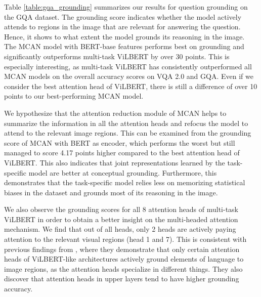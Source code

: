 \documentclass{article}
\begin{document}
Table \ref{table:gqa_grounding} summarizes our results for question grounding on the GQA dataset. The grounding score indicates whether the model actively attends to regions in the image that are relevant for answering the question. Hence, it shows to what extent the model grounds its reasoning in the image. The MCAN model with BERT-base features performs best on grounding and significantly outperforms multi-task ViLBERT by over 30 points. This is especially interesting, as multi-task ViLBERT has consistently outperformed all MCAN models on the overall accuracy scores on VQA 2.0 and GQA. Even if we consider the best attention head of ViLBERT, there is still a difference of over 10 points to our best-performing MCAN model.

We hypothesize that the attention reduction module of MCAN helps to summarize the information in all the attention heads and refocus the model to attend to the relevant image regions. This can be examined from the grounding score of MCAN with BERT as encoder, which performs the worst but still managed to score 4.17 points higher compared to the best attention head of ViLBERT. This also indicates that joint representations learned by the task-specific model are better at conceptual grounding. Furthermore, this demonstrates that the task-specific model relies less on memorizing statistical biases in the dataset and grounds most of its reasoning in the image.


We also observe the grounding scores for all 8 attention heads of multi-task ViLBERT in order to obtain a better insight on the multi-headed attention mechanism. We find that out of all heads, only 2 heads are actively paying attention to the relevant visual regions (head 1 and 7). This is consistent with previous findings from \citet{li2020bert}, where they demonstrate that only certain attention heads of ViLBERT-like architectures actively ground elements of language to image regions, as the attention heads specialize in different things. They also discover that attention heads in upper layers tend to have higher grounding accuracy. 
\end{document}
